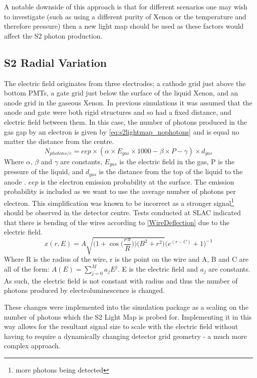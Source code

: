 \par
A notable downside of this approach is that for different scenarios one may wish to investigate (such as using a different purity of Xenon or the temperature and therefore pressure) then a new light map should be used as these factors would affect the S2 photon production.



\subsection{S2 Radial Variation} \label{sec:s2radialvariation}
\par
The electric field originates from three electrodes; a cathode grid just above the bottom PMTs, a gate grid just below the surface of the liquid Xenon, and an anode grid in the gaseous Xenon.
In previous simulations it was assumed that the anode and gate were both rigid structures and so had a fixed distance, and electric field between them.
In this case, the number of photons produced in the gas gap by an electron is given by \autoref{eq:s2lightmap_nophotons} and is equal no matter the distance from the centre. 
\begin{equation}
    N_{photons/e} = eep \times (\alpha \times E_{gas} \times 1000 - \beta \times P - \gamma) \times d_{gas}
    \label{eq:s2lightmap_nophotons}
\end{equation}
Where $\alpha$, $\beta$ and $\gamma$ are constants, $E_{gas}$ is the electric field in the gas, P is the pressure of the liquid, and $d_{gas}$ is the distance from the top of the liquid to the anode \cite{NoPhotonsPerElectron}.
$eep$ is the electron emission probability at the surface.
The emission probability is included as we want to use the average number of photons per electron.
This simplification was known to be incorrect as a stronger signal\footnote{more photons being detected} should be observed in the detector centre.
Tests conducted at SLAC indicated that there is bending of the wires according to \autoref{WireDeflection} due to the electric field.
\begin{equation}
    x(r,E) = A \sqrt{ \bigg( 1 + \cos{ \Big( \frac{r \pi}{R} } \Big) \bigg) \bigg( B^2 + r^2 \bigg) } \bigg( e^{(r-C)} + 1 \bigg)^{-1} 
    \label{WireDeflection}
\end{equation}
Where R is the radius of the wire, r is the point on the wire and A, B and C are all of the form: $A(E) = \sum_{j=0}^{M} a_{j} E^{j}$. E is the electric field and $a_{j}$ are constants.
As such, the electric field is not constant with radius and thus the number of photons produced by electroluminescence is changed.
\par
These changes were implemented into the simulation package as a scaling on the number of photons which the S2 Light Map is probed for.
Implementing it in this way allows for the resultant signal size to scale with the electric field without having to require a dynamically changing detector grid geometry - a much more complex approach.
